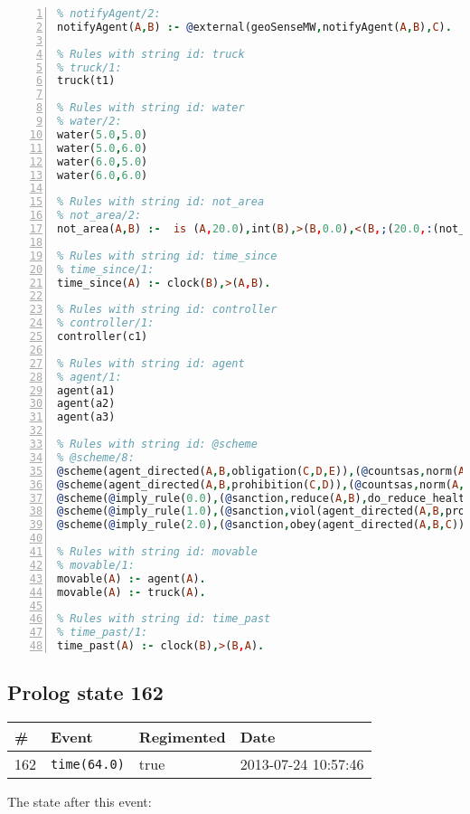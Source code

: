 \documentclass[11pt]{article}\usepackage[utf8]{inputenc}\usepackage{geometry}
\begin{document}
\begin{lstlisting}[language=Prolog, numbers=left]
% Rules with string id: notifyAgent
% notifyAgent/2:
notifyAgent(A,B) :- @external(geoSenseMW,notifyAgent(A,B),C).

% Rules with string id: truck
% truck/1:
truck(t1)

% Rules with string id: water
% water/2:
water(5.0,5.0)
water(5.0,6.0)
water(6.0,5.0)
water(6.0,6.0)

% Rules with string id: not_area
% not_area/2:
not_area(A,B) :-  is (A,20.0),int(B),>(B,0.0),<(B,;(20.0,:(not_area(A,B), is (-(B),20.0)))),int(A),>(A,0.0),<(A,;(20.0,:(area(A,B),-(int(A))))),int(B),>(A,0.0),>(B,0.0),<(A,21.0),<(B,21.0).

% Rules with string id: time_since
% time_since/1:
time_since(A) :- clock(B),>(A,B).

% Rules with string id: controller
% controller/1:
controller(c1)

% Rules with string id: agent
% agent/1:
agent(a1)
agent(a2)
agent(a3)

% Rules with string id: @scheme
% @scheme/8:
@scheme(agent_directed(A,B,obligation(C,D,E)),(@countsas,norm(A,B,F,obligation(C,D,E)),F),false,(listTrue(C)),(time_past(D)),false,[plus(viol(agent_directed(A,B,obligation(C,D,E))))|[]],[plus(obey(agent_directed(A,B,obligation(C,D,E))))|[]])
@scheme(agent_directed(A,B,prohibition(C,D)),(@countsas,norm(A,B,E,prohibition(C,D)),E),(listTrue(C)),false,(false),false,[plus(viol(agent_directed(A,B,prohibition(C,D))))|[]],[plus(obey(agent_directed(A,B,prohibition(C,D))))|[]])
@scheme(@imply_rule(0.0),(@sanction,reduce(A,B),do_reduce_health(A,B),notifyAgent(A,changed(status))),true,false,false,false,[min(reduce(A,B))|[]],[])
@scheme(@imply_rule(1.0),(@sanction,viol(agent_directed(A,B,prohibition(C,D))),do_sanction(D)),true,false,false,false,[min(viol(agent_directed(A,B,prohibition(C,D))))|[]],[])
@scheme(@imply_rule(2.0),(@sanction,obey(agent_directed(A,B,C))),true,false,false,false,[min(obey(agent_directed(A,B,C)))|[]],[])

% Rules with string id: movable
% movable/1:
movable(A) :- agent(A).
movable(A) :- truck(A).

% Rules with string id: time_past
% time_past/1:
time_past(A) :- clock(B),>(B,A).

\end{lstlisting}
\clearpage 
\subsection{Prolog state 162}
\begin{table}[ht]
\centering 
\begin{tabular}{l l l l} 
\textbf{\#} & \textbf{Event} & \textbf{Regimented} & \textbf{Date} \\ [0.5ex] 
\hline
162&\texttt{time(64.0)}&true&2013-07-24 10:57:46\\ [1ex] \hline\end{tabular}
\end{table}
The state after this event:
\end{document}
